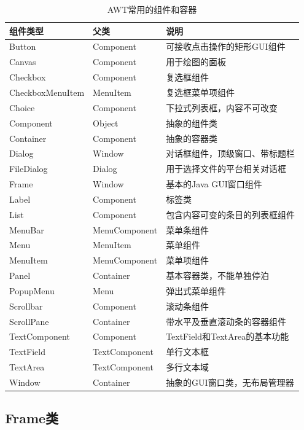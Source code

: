 \begin{table}[!htbp]
  \centering
  \caption{AWT常用的组件和容器}
  \label{tab:awt-components-and-containers}
  \begin{tabular}{l|l|l}
    {\bf 组件类型} & {\bf 父类}  & {\bf 说明}\\
    \hline
    Button & Component & 可接收点击操作的矩形GUI组件\\
    Canvas & Component & 用于绘图的面板\\
    Checkbox & Component & 复选框组件\\
    CheckboxMenuItem & MenuItem & 复选框菜单项组件\\
    Choice & Component & 下拉式列表框，内容不可改变\\
    Component & Object & 抽象的组件类\\
    Container & Component & 抽象的容器类\\
    Dialog & Window & 对话框组件，顶级窗口、带标题栏\\
    FileDialog & Dialog & 用于选择文件的平台相关对话框\\
    Frame & Window & 基本的Java GUI窗口组件\\
    Label & Component & 标签类\\
    List & Component & 包含内容可变的条目的列表框组件\\
    MenuBar & MenuComponent & 菜单条组件\\
    Menu & MenuItem & 菜单组件\\
    MenuItem & MenuComponent & 菜单项组件\\
    Panel & Container & 基本容器类，不能单独停泊\\
    PopupMenu & Menu & 弹出式菜单组件\\
    Scrollbar & Component & 滚动条组件\\
    ScrollPane & Container & 带水平及垂直滚动条的容器组件\\
    TextComponent & Component & TextField和TextArea的基本功能\\
    TextField & TextComponent & 单行文本框\\
    TextArea & TextComponent & 多行文本域\\
    Window & Container & 抽象的GUI窗口类，无布局管理器\\
  \end{tabular}
\end{table}

\subsection{Frame类}

